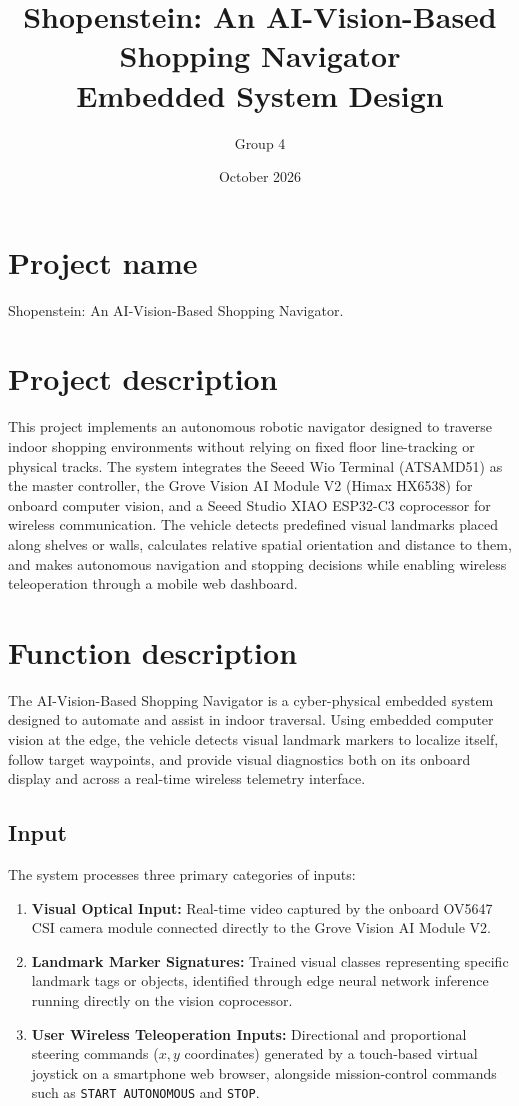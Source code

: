 \documentclass{article}
\title{Shopenstein: An AI-Vision-Based Shopping Navigator \\[0.5em] \large Embedded System Design}
\author{Group 4}
\date{October 2026}
\begin{document}
\maketitle

\section{Project name}

Shopenstein: An AI-Vision-Based Shopping Navigator.

\section{Project description}

This project implements an autonomous robotic navigator designed to traverse indoor shopping environments without relying on fixed floor line-tracking or physical tracks. The system integrates the Seeed Wio Terminal (ATSAMD51) as the master controller, the Grove Vision AI Module V2 (Himax HX6538) for onboard computer vision, and a Seeed Studio XIAO ESP32-C3 coprocessor for wireless communication. The vehicle detects predefined visual landmarks placed along shelves or walls, calculates relative spatial orientation and distance to them, and makes autonomous navigation and stopping decisions while enabling wireless teleoperation through a mobile web dashboard.

\section{Function description}

The AI-Vision-Based Shopping Navigator is a cyber-physical embedded system designed to automate and assist in indoor traversal. Using embedded computer vision at the edge, the vehicle detects visual landmark markers to localize itself, follow target waypoints, and provide visual diagnostics both on its onboard display and across a real-time wireless telemetry interface.

\subsection{Input}

The system processes three primary categories of inputs:

\begin{enumerate}
    \item \textbf{Visual Optical Input:} Real-time video captured by the onboard OV5647 CSI camera module connected directly to the Grove Vision AI Module V2.
    \item \textbf{Landmark Marker Signatures:} Trained visual classes representing specific landmark tags or objects, identified through edge neural network inference running directly on the vision coprocessor.
    \item \textbf{User Wireless Teleoperation Inputs:} Directional and proportional steering commands ($x, y$ coordinates) generated by a touch-based virtual joystick on a smartphone web browser, alongside mission-control commands such as \texttt{START AUTONOMOUS} and \texttt{STOP}.
\end{enumerate}
\end{document}
